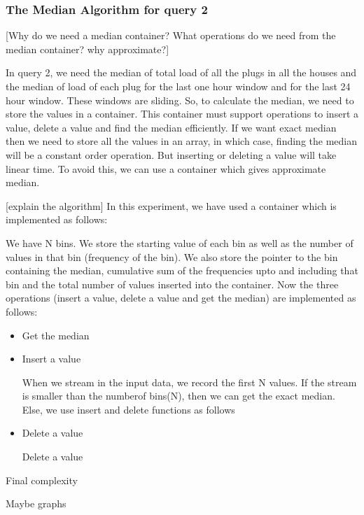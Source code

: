 \subsubsection{The Median Algorithm for query 2}
[Why do we need a median container?
What operations do we need from the median container?
why approximate?]

In query 2, we need the median of total load of all the plugs in all the houses and the median of load of each plug for the last one hour window and for the last 24 hour window. These windows are sliding. So, to calculate the median, we need to store the values in a container. This container must support operations to insert a value, delete a value and find the median efficiently. If we want exact median then we need to store all the values in an array, in which case, finding the median will be a constant order operation. But inserting or deleting a value will take linear time. To avoid this, we can use a container which gives approximate median.


[explain the algorithm]
In this experiment, we have used a container which is implemented as follows:

We have N bins. We store the starting value of each bin as well as the number of values in that bin (frequency of the bin). We also store the pointer to the bin containing the median, cumulative sum of the frequencies upto and including that bin and the total number of values inserted into the container. Now the three operations (insert a value, delete a value and get the median) are implemented as follows:



\begin{itemize}
  \item Get the median
  
  
  
  \item Insert a value
  
  When we stream in the input data, we record the first N values. If the stream is smaller than the numberof bins(N), then we can get the exact median. Else, we use insert and delete functions as follows
 
  \item Delete a value
  
  Delete a value
  
\end{itemize}







Final complexity

Maybe graphs

